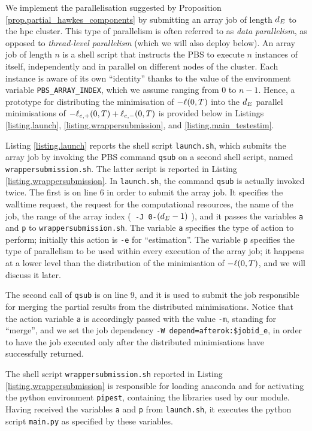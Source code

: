 \documentclass[10pt, article,table]{article}
\begin{document}
 We implement the parallelisation suggested by Proposition \ref{prop.partial_hawkes_components} by submitting an array job of length $d_{E}$ to the hpc cluster. This type of parallelism is often referred to as \emph{data parallelism}, as opposed to \emph{thread-level parallelism} (which we will also deploy below). An array job of length $n$ is a shell script that instructs the PBS to execute $n$ instances of itself, independently and in parallel on different nodes of the cluster. Each instance is aware of its own ``identity'' thanks to the value of the environment variable \texttt{PBS\_ARRAY\_INDEX}, which we assume ranging from $0$ to $n-1$. Hence, a prototype for distributing the minimisation of $-\ell(0,T)$ into the $d_{E}$ parallel minimisations of $ -\ell_{e,+}(0,T) + \ell_{e,-}(0,T)$ is provided below in Listings \ref{listing.launch}, \ref{listing.wrappersubmission}, and \ref{listing.main_testestim}.
 
Listing \ref{listing.launch} reports the shell script \texttt{launch.sh}, which submits the array job by invoking the PBS command \texttt{qsub} on a second shell script, named \texttt{wrappersubmission.sh}. The latter script is reported in Listing \ref{listing.wrappersubmission}.
In \texttt{launch.sh}, the command \texttt{qsub} is actually invoked twice. The first is on line 6 in order to submit the array job. It specifies the walltime request, the request for the computational resources, the name of the job, the range of the array index (\texttt{ -J 0-}$(d_{E} -1)$ ), and it passes the variables \texttt{a} and \texttt{p} to \texttt{wrappersubmission.sh}. The variable \texttt{a} specifies the type of action to perform; initially this action is \texttt{-e} for ``estimation''. The variable \texttt{p} specifies the type of parallelism to be used within every execution of the array job; it happens at a lower level than the distribution of the minimisation of $-\ell(0,T)$, and we will discuss it later. 

The second call of \texttt{qsub} is on line 9, and it is used to submit the job responsible for merging the partial results from the distributed minimisations. Notice that the action variable \texttt{a} is accordingly passed with the value \texttt{-m}, standing for ``merge'', and we set the job dependency \texttt{-W depend=afterok:\$jobid\_e}, in order to have the job executed only after the distributed minimisations have successfully returned. 

The shell script \texttt{wrappersubmission.sh} reported in Listing \ref{listing.wrappersubmission} is responsible for loading anaconda and for activating the python environment \texttt{pipest}, containing the libraries used by our module. Having received the variables \texttt{a} and \texttt{p} from \texttt{launch.sh}, it executes the python script \texttt{main.py} as specified by these variables.
\end{document}
